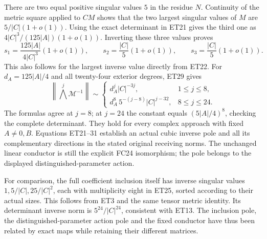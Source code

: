 \documentclass[11pt]{article}
\begin{document}
There are two equal positive singular values $5$ in the residue $N$.
Continuity of the metric square applied to $CM$ shows that the two
largest singular values of $M$ are $5/|C|(1+o(1))$.
Using the exact determinant in ET21 gives the third one as
$4|C|^3/(125|A|)(1+o(1))$. Inverting these three values proves
\[
 s_1=\frac{125|A|}{4|C|^3}(1+o(1)),\qquad
 s_2=\frac{|C|}{5}(1+o(1)),\qquad
 s_3=\frac{|C|}{5}(1+o(1)).
 \tag{ET30}
\]
This also follows for the largest inverse value directly from ET22.
For $d_A=125|A|/4$ and all twenty-four exterior degrees, ET29 gives
\[
 \left\|\bigwedge^j\mathcal M^{-1}\right\|\sim
 \begin{cases}
 d_A^j|C|^{-3j},&1\le j\le8,\\
 d_A^8\,5^{-(j-8)}|C|^{j-32},&8\le j\le24.
 \end{cases}
 \tag{ET31}
\]
The formulas agree at $j=8$; at $j=24$ the constant equals
$(5|A|/4)^8$, checking the complete determinant.
They hold for every complex approach with fixed $A\ne0,B$.
Equations ET21--31 establish an actual cubic inverse pole and all its
complementary directions in the stated original receiving norms.
The unchanged linear conductor is still the explicit FC24 isomorphism;
the pole belongs to the displayed distinguished-parameter action.

For comparison, the full coefficient inclusion itself has inverse
singular values $1,5/|C|,25/|C|^2$, each with multiplicity eight in
ET25, sorted according to their actual sizes. This follows from ET3
and the same tensor metric identity. Its determinant inverse norm is
$5^{24}/|C|^{24}$, consistent with ET13. The inclusion pole, the
distinguished-parameter action pole and the fixed conductor have thus
been related by exact maps while retaining their different matrices.
\end{document}
